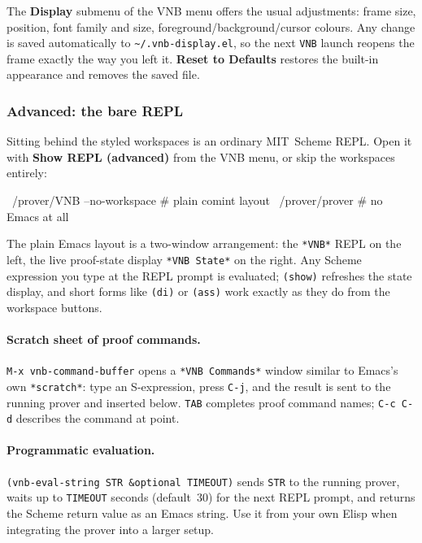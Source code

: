 The \textbf{Display} submenu of the VNB menu offers the usual
adjustments: frame size, position, font family and size,
foreground/background/cursor colours.  Any change is saved
automatically to \texttt{\textasciitilde/.vnb-display.el}, so the
next \texttt{VNB} launch reopens the frame exactly the way you
left it.  \textbf{Reset to Defaults} restores the built-in
appearance and removes the saved file.

\subsubsection{Advanced: the bare REPL}

Sitting behind the styled workspaces is an ordinary MIT~Scheme
REPL.  Open it with \textbf{Show REPL (advanced)} from the VNB
menu, or skip the workspaces entirely:

\begin{VNBsnip}
~/prover/VNB --no-workspace       # plain comint layout
~/prover/prover                   # no Emacs at all
\end{VNBsnip}

\noindent
The plain Emacs layout is a two-window arrangement: the
\texttt{*VNB*} REPL on the left, the live proof-state display
\texttt{*VNB State*} on the right.  Any Scheme expression you type
at the REPL prompt is evaluated; \texttt{(show)} refreshes the
state display, and short forms like \texttt{(di)} or \texttt{(ass)}
work exactly as they do from the workspace buttons.

\paragraph{Scratch sheet of proof commands.}
\texttt{M-x vnb-command-buffer} opens a \texttt{*VNB Commands*}
window similar to Emacs's own \texttt{*scratch*}: type an
S-expression, press \texttt{C-j}, and the result is sent to the
running prover and inserted below.  \texttt{TAB} completes proof
command names; \texttt{C-c C-d} describes the command at point.

\paragraph{Programmatic evaluation.}
\texttt{(vnb-eval-string STR \&optional TIMEOUT)} sends \texttt{STR}
to the running prover, waits up to \texttt{TIMEOUT} seconds
(default~30) for the next REPL prompt, and returns the Scheme
return value as an Emacs string.  Use it from your own Elisp when
integrating the prover into a larger setup.

